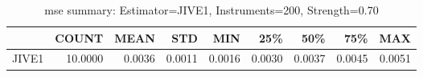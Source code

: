 \begin{table}[ht]
\centering
\caption{mse summary: Estimator=JIVE1, Instruments=200, Strength=0.70}
\begin{tabular}{lrrrrrrrr}
\toprule
 & COUNT & MEAN & STD & MIN & 25\% & 50\% & 75\% & MAX \\
\midrule
JIVE1 & 10.0000 & 0.0036 & 0.0011 & 0.0016 & 0.0030 & 0.0037 & 0.0045 & 0.0051 \\
\bottomrule
\end{tabular}
\end{table}
